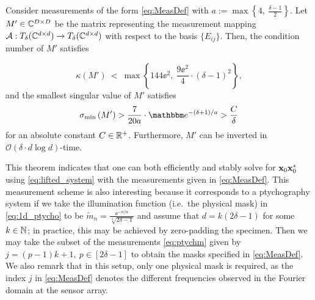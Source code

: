 \begin{thm}
Consider measurements of the form \eqref{eq:MeasDef} with $a:= \max \left\{ 4,~\frac{\delta - 1}{2} \right\}$. 
Let $M' \in \mathbb{C}^{D \times D}$ be the matrix representing the measurement mapping $\mathcal{A} : T_{\delta}(\mathbb{C}^{d \times d}) \to T_{\delta}(\mathbb{C}^{d \times d})$ with respect to the basis $\{E_{ij}\}$.  Then, the condition number of $M'$ satisfies 



%
$$\kappa \left( M' \right) ~<~ \max
\left\{ 144 \ee^2,~\frac{9 \ee^2}{4} \cdot (\delta -
1)^2 \right \},$$
%
and the smallest singular value of $M'$ satisfies
%
$$\sigma_{\rm min} \left( M' \right) > \frac{7}{20 a} \cdot \ee^{-(\delta + 1)/a} > \frac{C}{\delta}$$
%
for an absolute constant $C \in \mathbb{R}^+$.  Furthermore, $M'$ can be
inverted in $\mathcal{O} \left( \delta \cdot d \log d \right)$-time.
\label{thm:WellCondMeas}
\end{thm}

This theorem indicates that one can both efficiently and stably solve for $\mathbf x_0 \mathbf x_0^*$ using \eqref{eq:lifted_system} with the measurements given in \eqref{eq:MeasDef}.   This measurement scheme is also interesting because it corresponds to a ptychography system if we take the illumination function (i.e.~the physical mask) in \eqref{eq:1d_ptycho} to be $\widetilde{m}_n = \frac{\ee^{- n / a}}{\sqrt[4]{2 \delta - 1}}$ and assume that $d = k(2 \delta - 1)$ for some $k \in \mathbb{N}$; in practice, this may be achieved by zero-padding the specimen.  Then we may take the subset of the measurements \eqref{eq:ptychm} given by $j = (p -1)k + 1, \ p \in [2 \delta - 1]$ to obtain the masks specified in \eqref{eq:MeasDef}.  We also remark that in this setup, only one physical mask is required, as the index $j$ in \eqref{eq:MeasDef} denotes the different frequencies observed in the Fourier domain at the sensor array.


